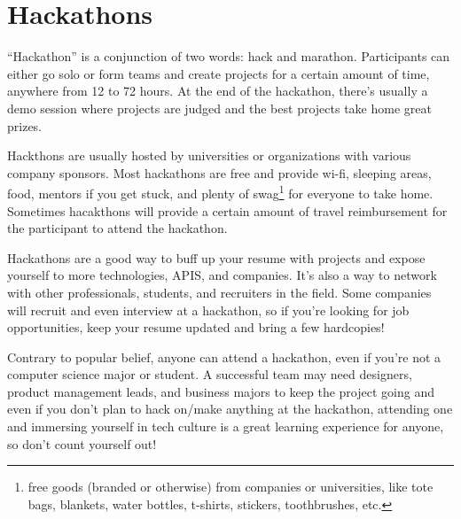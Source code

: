 \documentclass{article}
\begin{document}
\section {Hackathons}
\label{sec:hackathons}
``Hackathon'' is a conjunction of two words: hack and marathon. Participants can
either go solo or form teams and create projects for a certain amount of time,
anywhere from 12 to 72 hours. At the end of the hackathon, there's usually a
demo session where projects are judged and the best projects take home great
prizes.

Hackthons are usually hosted by universities or organizations with various
company sponsors. Most hackathons are free and provide wi-fi, sleeping areas,
food, mentors if you get stuck, and plenty of swag\footnote{free goods
(branded or otherwise) from companies or universities, like tote bags, blankets,
water bottles, t-shirts, stickers, toothbrushes, etc.}
for everyone to take home. Sometimes hacakthons will provide a certain amount of
travel reimbursement for the participant to attend the hackathon.

Hackathons are a good way to buff up your resume with projects and expose
yourself to more technologies, APIS, and companies. It's also a way to network
with other professionals, students, and recruiters in the field. Some companies
will recruit and even interview at a hackathon, so if you're looking for job
opportunities, keep your resume updated and bring a few hardcopies!

Contrary to popular belief, anyone can attend a hackathon, even if you're not a
computer science major or student. A successful team may need designers, product
management leads, and business majors to keep the project going and even if you
don't plan to hack on/make anything at the hackathon, attending one and
immersing yourself in tech culture is a great learning experience for anyone, so
don't count yourself out!
\end{document}
